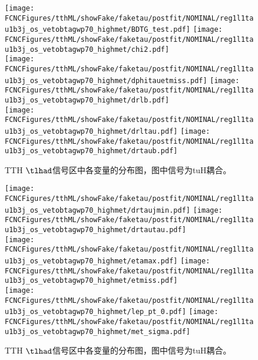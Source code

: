 \begin{figure}[H]
\centering
\texttt{[image: \\FCNCFigures/tthML/showFake/faketau/postfit/NOMINAL/reg1l1tau1b3j\_os\_vetobtagwp70\_highmet/BDTG\_test.pdf]}
\texttt{[image: \\FCNCFigures/tthML/showFake/faketau/postfit/NOMINAL/reg1l1tau1b3j\_os\_vetobtagwp70\_highmet/chi2.pdf]}
\\
\texttt{[image: \\FCNCFigures/tthML/showFake/faketau/postfit/NOMINAL/reg1l1tau1b3j\_os\_vetobtagwp70\_highmet/dphitauetmiss.pdf]}
\texttt{[image: \\FCNCFigures/tthML/showFake/faketau/postfit/NOMINAL/reg1l1tau1b3j\_os\_vetobtagwp70\_highmet/drlb.pdf]}
\\
\texttt{[image: \\FCNCFigures/tthML/showFake/faketau/postfit/NOMINAL/reg1l1tau1b3j\_os\_vetobtagwp70\_highmet/drltau.pdf]}
\texttt{[image: \\FCNCFigures/tthML/showFake/faketau/postfit/NOMINAL/reg1l1tau1b3j\_os\_vetobtagwp70\_highmet/drtaub.pdf]}
\\
\caption{TTH $\tlhad$信号区中各变量的分布图，图中信号为tuH耦合。}
\label{fig:var_reg1l1tau1b3j_os_vetobtagwp70_highmet_0}
\end{figure}
\begin{figure}[H]
\centering
\texttt{[image: \\FCNCFigures/tthML/showFake/faketau/postfit/NOMINAL/reg1l1tau1b3j\_os\_vetobtagwp70\_highmet/drtaujmin.pdf]}
\texttt{[image: \\FCNCFigures/tthML/showFake/faketau/postfit/NOMINAL/reg1l1tau1b3j\_os\_vetobtagwp70\_highmet/drtautau.pdf]}
\\
\texttt{[image: \\FCNCFigures/tthML/showFake/faketau/postfit/NOMINAL/reg1l1tau1b3j\_os\_vetobtagwp70\_highmet/etamax.pdf]}
\texttt{[image: \\FCNCFigures/tthML/showFake/faketau/postfit/NOMINAL/reg1l1tau1b3j\_os\_vetobtagwp70\_highmet/etmiss.pdf]}
\\
\texttt{[image: \\FCNCFigures/tthML/showFake/faketau/postfit/NOMINAL/reg1l1tau1b3j\_os\_vetobtagwp70\_highmet/lep\_pt\_0.pdf]}
\texttt{[image: \\FCNCFigures/tthML/showFake/faketau/postfit/NOMINAL/reg1l1tau1b3j\_os\_vetobtagwp70\_highmet/met\_sigma.pdf]}
\\
\caption{TTH $\tlhad$信号区中各变量的分布图，图中信号为tuH耦合。}
\label{fig:var_reg1l1tau1b3j_os_vetobtagwp70_highmet_1}
\end{figure}
